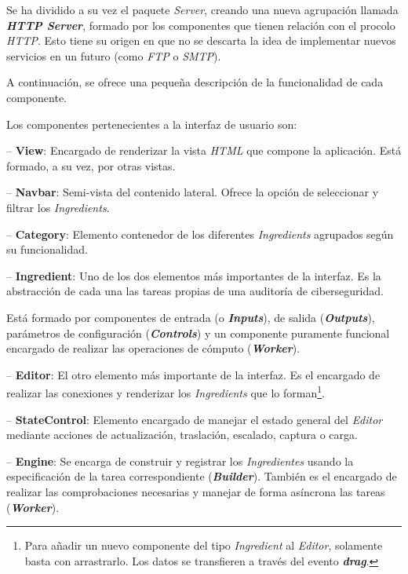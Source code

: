 Se ha dividido a su vez el paquete \textit{Server}, creando una nueva agrupación llamada \textbf{\textit{HTTP Server}}, formado por los componentes que tienen relación con el procolo \textit{HTTP}. Esto tiene su origen en que no se descarta la idea de implementar nuevos servicios en un futuro (como \textit{FTP} o \textit{SMTP}).\sn

A continuación, se ofrece una pequeña descripción de la funcionalidad de cada componente.\n

Los componentes pertenecientes a la interfaz de usuario son:\sn

-- \textbf{View}: Encargado de renderizar la vista \textit{HTML} que compone la aplicación. Está formado, a su vez, por otras vistas.\sn

-- \textbf{Navbar}: Semi-vista del contenido lateral. Ofrece la opción de seleccionar y filtrar los \textit{Ingredients}.\sn

-- \textbf{Category}: Elemento contenedor de los diferentes \textit{Ingredients} agrupados según su funcionalidad.\sn

-- \textbf{Ingredient}: Uno de los dos elementos más importantes de la interfaz. Es la abstracción de cada una las tareas propias de una auditoría de ciberseguridad.

Está formado por componentes de entrada (o \textbf{\textit{Inputs}}), de salida (\textbf{\textit{Outputs}}), parámetros de configuración (\textbf{\textit{Controls}}) y un componente puramente funcional encargado de realizar las operaciones de cómputo (\textbf{\textit{Worker}}).\sn

-- \textbf{Editor}: El otro elemento más importante de la interfaz. Es el encargado de realizar las conexiones y renderizar los \textit{Ingredients} que lo forman\footnote{Para añadir un nuevo componente del tipo \textit{Ingredient} al \textit{Editor}, solamente basta con arrastrarlo. Los datos se transfieren a través del evento \textbf{\textit{drag}}.}.\sn

-- \textbf{StateControl}: Elemento encargado de manejar el estado general del \textit{Editor} mediante acciones de actualización, traslación, escalado, captura o carga.\sn

-- \textbf{Engine}: Se encarga de construir y registrar los \textit{Ingredientes} usando la especificación de la tarea correspondiente (\textbf{\textit{Builder}}).
También es el encargado de realizar las comprobaciones necesarias y manejar de forma asíncrona las tareas (\textbf{\textit{Worker}}).\n

